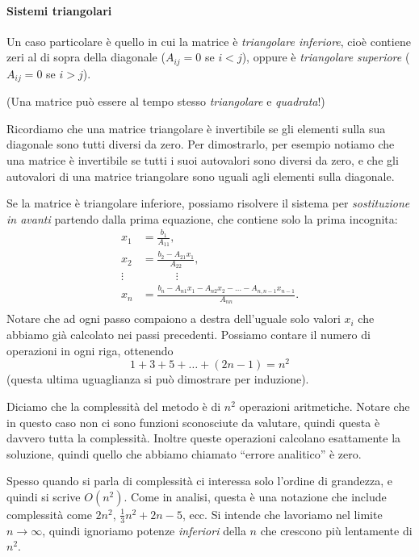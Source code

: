 \documentclass[a4paper]{report}
\theoremstyle{definiton}
\theoremstyle{remark}
\begin{document}
\paragraph{Sistemi triangolari}

Un caso particolare  è quello in cui la matrice è \emph{triangolare inferiore}, cioè contiene zeri al di sopra della diagonale ($A_{ij} =0$ se $i<j$), oppure è \emph{triangolare superiore} ($A_{ij}=0$ se $i>j$).

(Una matrice può essere al tempo stesso \emph{triangolare} e \emph{quadrata}!)

Ricordiamo che una matrice triangolare è invertibile se gli elementi sulla sua diagonale sono tutti diversi da zero. Per dimostrarlo, per esempio notiamo che una matrice è invertibile se tutti i suoi autovalori sono diversi da zero, e che gli autovalori di una matrice triangolare sono uguali agli elementi sulla diagonale.

Se la matrice è triangolare inferiore, possiamo risolvere il sistema per \emph{sostituzione in avanti} partendo dalla prima equazione, che contiene solo la prima incognita:
\begin{align*}
 x_1 &= \frac{b_1}{A_{11}},\\
 x_2 &= \frac{b_2 - A_{21}x_1}{A_{22}},\\
 \vdots & \quad \quad \quad \vdots\\
 x_n &= \frac{b_n - A_{n1}x_1 - A_{n2}x_2 - \dots -A_{n,n-1}x_{n-1}}{A_{nn}}.\\
 \end{align*} 
Notare che ad ogni passo compaiono a destra dell'uguale solo valori $x_i$ che abbiamo già calcolato nei passi precedenti.
Possiamo contare il numero di operazioni in ogni riga, ottenendo
\[
1 + 3 + 5 + \dots + (2n-1) = n^2
\]
(questa ultima uguaglianza si può dimostrare per induzione).

Diciamo che la complessità del metodo è di $n^2$ operazioni aritmetiche. Notare che in questo caso non ci sono funzioni sconosciute da valutare, quindi questa è davvero tutta la complessità. Inoltre queste operazioni calcolano esattamente la soluzione, quindi quello che abbiamo chiamato ``errore analitico'' è zero.

Spesso quando si parla di complessità ci interessa solo l'ordine di grandezza, e quindi si scrive $O(n^2)$. Come in analisi, questa è una notazione che include complessità come $2n^2$, $\frac{1}{3}n^2 + 2n - 5$, ecc. Si intende che lavoriamo nel limite $n\to \infty$, quindi ignoriamo potenze \emph{inferiori} della $n$ che crescono più lentamente di $n^2$. 
\end{document}
